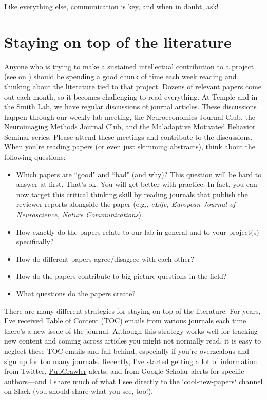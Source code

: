 \documentclass[letterpaper,12pt,oneside]{memoir}
\begin{document}
Like everything else, communication is key, and when in doubt, ask!

\section{Staying on top of the literature}
\label{sec:literature}

Anyone who is trying to make a sustained intellectual contribution to a project (see  on ) should be spending a good chunk of time each week reading and thinking about the literature tied to that project. Dozens of relevant papers come out each month, so it becomes challenging to read everything. At Temple and in the Smith Lab, we have regular discussions of journal articles. These discussions happen through our weekly lab meeting, the Neuroeconomics Journal Club, the Neuroimaging Methods Journal Club, and the Maladaptive Motivated Behavior Seminar series. Please attend these meetings and contribute to the discussions. When you're reading papers (or even just skimming abstracts), think about the following questions:

\begin{itemize}
\item Which papers are ``good" and ``bad" (and why)? This question will be hard to answer at first. That's ok. You will get better with practice. In fact, you can now target this critical thinking skill by reading journals that publish the reviewer reports alongside the paper (e.g., \textit{eLife, European Journal of Neuroscience, Nature Communications}).
\item How exactly do the papers relate to our lab in general and to your project(s) specifically?
\item How do different papers agree/disagree with each other?
\item How do the papers contribute to big-picture questions in the field? 
\item What questions do the papers create?  
\end{itemize}

There are many different strategies for staying on top of the literature. For years, I've received Table of Content (TOC) emails from various journals each time there's a new issue of the journal. Although this strategy works well for tracking new content and coming across articles you might not normally read, it is easy to neglect these TOC emails and fall behind, especially if you're overzealous and sign up for too many journals. Recently, I've started getting a lot of information from Twitter, \href{http://pubcrawler.gen.tcd.ie/}{PubCrawler} alerts, and from Google Scholar alerts for specific authors---and I share much of what I see directly to the `cool-new-papers` channel on Slack (you should share what you see, too!).
\end{document}
